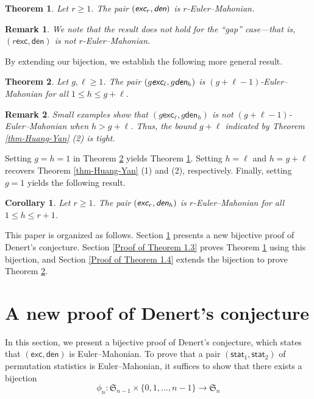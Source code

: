 \documentclass[12pt]{article}
\newtheorem{theorem}{Theorem}[section]
\newtheorem{corollary}{Corollary}[section]
\newtheorem{remark}{Remark}[section]
\begin{document}
\begin{theorem}\label{mian-theorem-(excr,den)}
Let $r\geq1$. The pair  $(\emph{\textsf{exc}}_{r},\emph{\textsf{den}})$ is $r$-Euler--Mahonian.
\end{theorem}
\begin{remark}
	\emph{We note that the result does \emph{not} hold for the ``gap'' case---that is, $(r\textsf{exc},\textsf{den})$ is \emph{not}  $r$-Euler--Mahonian. }
\end{remark}
\newpage
By extending our bijection, we establish the following more general result.
\begin{theorem}\label{mian-general-theorem}
	Let $g,\ell\geq1$.
	The pair $(g\emph{\textsf{exc}}_{\ell},g\emph{\textsf{den}}_{h})$ is $(g+\ell-1)$-Euler--Mahonian for all 
	$1\leq h\leq g+\ell$.
\end{theorem}
\begin{remark}
	\emph{Small examples show that $(g\textsf{exc}_{\ell},g\textsf{den}_{h})$ is \emph{not}  
	$(g+\ell-1)$-Euler--Mahonian when $h>g+\ell$. 
	Thus, the bound $g+\ell$ indicated by Theorem \ref{thm-Huang-Yan} (2) is tight.
	}
\end{remark} 
Setting $g=h=1$ in Theorem \ref{mian-general-theorem} yields Theorem  \ref{mian-theorem-(excr,den)}.
Setting $h=\ell$ and $h=g+\ell$ 
recovers  Theorem \ref{thm-Huang-Yan} (1) and (2), respectively. 
Finally, setting $g=1$ yields the following result.
\begin{corollary} \label{corr-1}
	Let $r\geq1$.
	The pair $(\emph{\textsf{exc}}_{r},\emph{\textsf{den}}_{h})$ is $r$-Euler--Mahonian for all $1\leq h\leq r+1$.
\end{corollary}
This paper is organized as follows. 
Section \ref{section-new-proof} presents a new bijective proof of Denert's conjecture. 
Section \ref{Proof of Theorem 1.3} proves Theorem \ref{mian-theorem-(excr,den)} using this bijection, 
and Section \ref{Proof of Theorem 1.4} extends the bijection to prove Theorem \ref{mian-general-theorem}.

\section{A new proof of Denert's conjecture}\label{section-new-proof}
\label{new proof of Denert's conjecture}
In this section, we present a bijective proof of Denert's conjecture,  
which states that $(\textsf{exc},\textsf{den})$ is Euler--Mahonian.
To prove that a pair $(\textsf{stat}_{1},\textsf{stat}_{2})$ of permutation statistics is Euler--Mahonian, 
it suffices to show that there exists a bijection
\vspace{-6pt}
 $$\phi_{n}:\mathfrak{S}_{n-1}\times\{0,1,\ldots,n-1\}\rightarrow\mathfrak{S}_{n}$$
 
\end{document}
